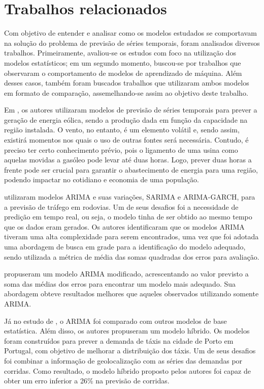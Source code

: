 \documentclass[
    12pt,
    oneside,
    a4paper,
    english,
    brazil
]{abntex2}
\begin{document}
\chapter{Trabalhos relacionados}\label{chap:trab_relacionados}

Com objetivo de  entender e analisar como os modelos  estudados se comportavam na solução do problema de previsão de séries temporais,
foram analisados diversos trabalhos.  Primeiramente, avaliou-se  os estudos
com foco  na utilização  dos modelos  estatísticos; em um segundo momento, 
buscou-se por trabalhos que observaram o  comportamento de modelos  de aprendizado  de máquina.
Além  desses casos,  também foram buscados  trabalhos  que utilizaram  ambos modelos  em
formato de comparação, assemelhando-se assim ao objetivo deste trabalho.


Em , os autores utilizaram modelos de previsão de séries temporais para prever a  geração  de energia eólica, sendo a produção dada  em função da capacidade na região instalada. O vento,  no entanto,  é um  elemento volátil e,  sendo assim,  existirá momentos nos
quais o  uso de  outras fontes  será necessária. Contudo,  é preciso  ter certo
conhecimento prévio,  pois o  ligamento de  uma usina  como aquelas  movidas a
gasóleo pode levar até duas horas. Logo,  prever duas horas a  frente pode ser
crucial para garantir o abastecimento de energia para uma região, podendo impactar
no cotidiano e economia de uma população.

  utilizaram modelos  ARIMA   e  suas  variações, SARIMA  e
ARIMA-GARCH, para a previsão de tráfego em  rodovias. Um de seus  desafios foi a
necessidade de predição em tempo real, ou seja, o modelo tinha de ser obtido ao
mesmo tempo  que os dados eram  gerados. Os autores identificaram que os modelos 
ARIMA tiveram uma alta complexidade para serem encontrados, uma vez que foi adotada
uma abordagem de busca em grade para a identificação do modelo adequado,  sendo 
utilizada a  métrica de média das somas quadradas dos erros para avaliação.

  propuseram um  modelo  ARIMA modificado, acrescentando ao  valor
previsto a  soma das médias dos  erros para encontrar um  modelo mais adequado.
Sua  abordagem obteve  resultados  melhores que  aqueles observados  utilizando
somente ARIMA\@.

Já no estudo de , o  ARIMA foi comparado com outros modelos de base estatística. Além disso, os autores propuseram um modelo híbrido. Os modelos foram construídos para prever a demanda de táxis na cidade  de Porto em Portugal, com objetivo  de melhorar a distribuição dos táxis. Um de seus desafios  foi combinar a informação de geolocalização com as séries das demandas por corridas. Como  resultado, o modelo híbrido proposto pelos autores foi capaz de obter um erro inferior a 26\% na previsão de corridas.
\end{document}
